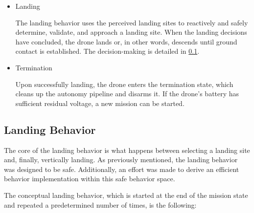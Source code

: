 \begin{itemize}
    \item Landing
    
    The landing behavior uses the perceived landing sites to reactively and safely determine, validate, and approach a landing site. When the landing decisions have concluded, the drone lands or, in other words, descends until ground contact is established. The decision-making is detailed in \cref{subsec:landing_behavior}. 

    \item Termination

    Upon successfully landing, the drone enters the termination state, which cleans up the autonomy pipeline and disarms it. If the drone's battery has sufficient residual voltage, a new mission can be started.
\end{itemize}

\subsection{Landing Behavior}\label{subsec:landing_behavior}

The core of the landing behavior is what happens between selecting a landing site and, finally, vertically landing. As previously mentioned, the landing behavior was designed to be safe. Additionally, an effort was made to derive an efficient behavior implementation within this safe behavior space.

The conceptual landing behavior, which is started at the end of the mission state and repeated a predetermined number of times, is the following:

